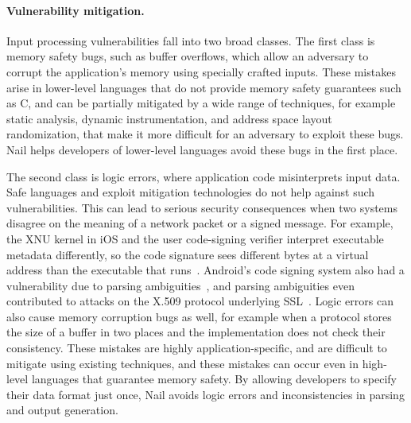 \paragraph{Vulnerability mitigation.}

Input processing vulnerabilities fall into two broad classes.  The first
class is memory safety bugs, such as buffer overflows, which allow an
adversary to corrupt the application's memory using specially crafted
inputs.  These mistakes arise in lower-level languages that do not
provide memory safety guarantees such as C, and can be partially
mitigated by a wide range of techniques, for example static analysis,
dynamic instrumentation, and address space layout randomization, that
make it more difficult for an adversary to exploit these bugs.
Nail helps developers of lower-level languages avoid these bugs
in the first place.

The second class is logic errors, where application code misinterprets
input data. Safe languages and exploit mitigation technologies do not
help against such vulnerabilities. This can lead to serious security
consequences when two systems disagree on the meaning of a network
packet or a signed message.  For example, the XNU kernel in iOS and the
user code-signing verifier interpret executable metadata differently,
so the code signature sees different bytes at a virtual address than the
executable that runs~\cite{evaders6}.  Android's code signing system also
had a vulnerability due to parsing ambiguities~\cite{saurik-masterkey},
and parsing ambiguities even contributed to attacks on the X.509 protocol
underlying SSL~\cite{DBLP:conf/fc/KaminskyPS10}.  Logic errors can also
cause memory corruption bugs as well, for example when a protocol stores
the size of a buffer in two places and the implementation does not check
their consistency. These mistakes are highly application-specific, and
are difficult to mitigate using existing techniques, and these mistakes
can occur even in high-level languages that guarantee memory safety. By
allowing developers to specify their data format just once, Nail avoids
logic errors and inconsistencies in parsing and output generation.


